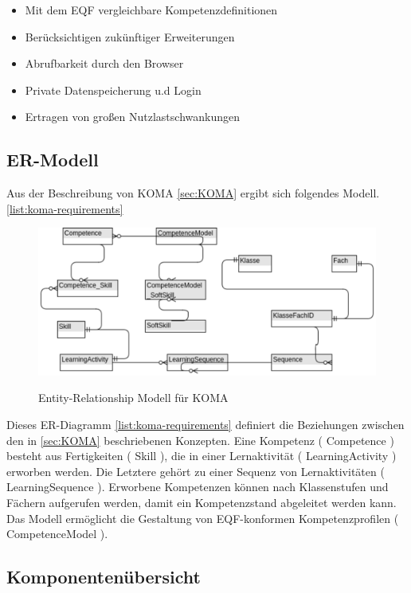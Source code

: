 \documentclass[
12pt,
english,
ngerman,
headsepline,
twoside,
openright,
numbers=noenddot,version=first
]{scrreprt}
\begin{document}
\begin{itemize}\label{list:koma-requirements}
	\item Mit dem \acrshort{EQF} vergleichbare Kompetenzdefinitionen
	\item Berücksichtigen zukünftiger Erweiterungen 
	\item Abrufbarkeit durch den Browser 
	\item Private Datenspeicherung u.d Login
	\item Ertragen von großen Nutzlastschwankungen
\end{itemize}

\subsection{ER-Modell} Aus der Beschreibung von \acrshort{KOMA} \autoref{sec:KOMA} ergibt sich folgendes Modell.\autoref{list:koma-requirements}
\begin{figure}[h]
	\centering
	\includegraphics[scale=1]{./pics/koma-er-concept.eps}
	\label{pic:koma-er-concept}
	\caption{Entity-Relationship Modell für KOMA}
\end{figure}

Dieses ER-Diagramm \autoref{list:koma-requirements} definiert die Beziehungen zwischen den in \autoref{sec:KOMA} beschriebenen Konzepten. Eine Kompetenz ( Competence ) besteht aus Fertigkeiten ( Skill ), die in einer Lernaktivität ( LearningActivity ) erworben werden. Die Letztere gehört zu einer Sequenz von Lernaktivitäten ( LearningSequence ). Erworbene Kompetenzen können nach Klassenstufen und Fächern aufgerufen werden, damit ein Kompetenzstand abgeleitet werden kann. Das Modell ermöglicht die Gestaltung von \acrshort{EQF}-konformen Kompetenzprofilen ( CompetenceModel ).



\subsection{Komponentenübersicht}
\label{sec:components}
\end{document}
